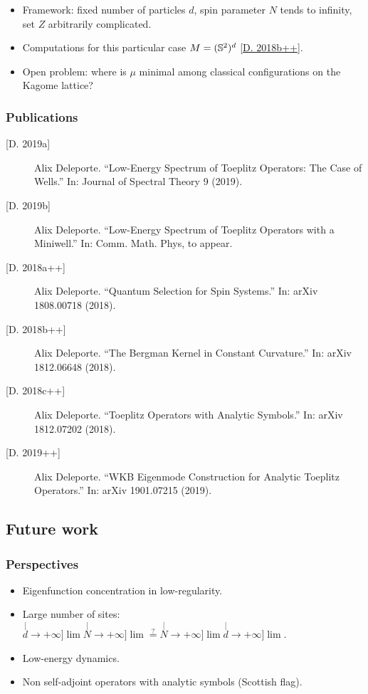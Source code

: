 \documentclass[mathserif]{beamer}
\newcommand{\mycite}[1]{{\color{mygreen} \small #1}}
\begin{document}
\begin{frame}
\begin{center}
  \end{center}
  \begin{itemize}
\item  Framework: fixed number of particles $d$, spin parameter $N$
  tends to infinity, set $Z$ arbitrarily complicated.

  \item<2->{Computations for this particular case
    $M=(\S^2)^d$ \mycite{[\underline{D. 2018b++}]}.}

  \item<3>{{\color{myorange} Open problem}: where is $\mu$ minimal among classical
      configurations on the Kagome lattice?}
  \end{itemize}
\end{frame}

     \begin{frame}
        \frametitle{Publications}
        {\footnotesize
        \begin{description}
        \item[{[D. 2019a]}] Alix Deleporte. “Low-Energy Spectrum of Toeplitz Operators: The Case
of Wells.” In: Journal of Spectral Theory 9 (2019).
\item[{[D. 2019b]}] Alix Deleporte. “Low-Energy Spectrum of Toeplitz Operators with a
Miniwell.” In: Comm. Math. Phys, to appear.
\item[{[D. 2018a++]}] Alix Deleporte. “Quantum Selection for Spin Systems.” In: arXiv
1808.00718 (2018).
\item[{[D. 2018b++]}] Alix Deleporte. “The Bergman Kernel in Constant Curvature.” In:
arXiv 1812.06648 (2018).
\item[{[D. 2018c++]}] Alix Deleporte. “Toeplitz Operators with Analytic Symbols.” In: arXiv
1812.07202 (2018).
\item[{[D. 2019++]}] Alix Deleporte. “WKB Eigenmode Construction for Analytic Toeplitz
  Operators.” In: arXiv 1901.07215 (2019).
        \end{description}}
      \end{frame}

\subsection{Future work}
\begin{frame}
  \frametitle{Perspectives}
    \begin{itemize}
    \item Eigenfunction concentration in low-regularity.
    \item Large number of sites: $\stackrel[d\to +\infty]{}{\lim}\stackrel[N\to +\infty]{}{\lim}\stackrel{?}{=}\stackrel[N\to +\infty]{}{\lim}\stackrel[d\to +\infty]{}{\lim}$.
    \item Low-energy dynamics.
    \item Non self-adjoint operators with analytic symbols (Scottish flag).
    \end{itemize}
  \end{frame}
\end{document}
